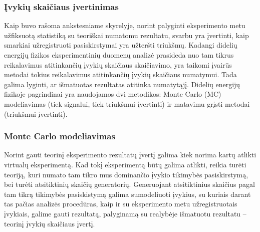 \documentclass[a4paper, 12pt]{article}
\begin{document}


\subsubsection{Įvykių skaičiaus įvertinimas} \label{sec:estimation}

Kaip buvo rašoma ankstesniame skyrelyje, norint palyginti eksperimento metu užfiksuotą
statistiką su teoriškai numatomu rezultatu, svarbu yra įvertinti, kaip smarkiai užregistruoti
pasiskirstymai yra užteršti triukšmų.
Kadangi didelių energijų fizikos eksperimentinių duomenų analizė prasideda nuo tam tikrus
reikalavimus atitinkančių įvykių skaičiaus skaičiavimo, yra taikomi įvairūs metodai
tokius reikalavimus atitinkančių įvykių skaičiaus numatymui.
Tada galima lyginti, ar išmatuotas rezultatas atitinka numatytąjį.
Didelių energijų fizikoje pagrindinai yra naudojamos dvi metodikos: Monte Carlo (MC) modeliavimas
(tiek signalui, tiek triukšmui įvertinti) ir matavimu grįsti metodai (triukšmui įvertinti).

\subsubsection*{Monte Carlo modeliavimas}

Norint gauti teorinį eksperimento rezultatų įvertį galima kiek norima kartų atlikti virtualų
eksperimentą.
Kad tokį eksperimentą būtų galima atlikti, reikia turėti teoriją, kuri numato tam tikro mus
dominančio įvykio tikimybės pasiskirstymą, bei turėti atsitiktinių skaičių generatorių.
Generuojant atsitiktinius skaičius pagal tam tikrą tikimybės pasiskistymą galima sumodeliuoti
įvykius, su kuriais darant tas pačias analizės procedūras, kaip ir su eksperimento metu
užregistruotais įvykiais, galime gauti rezultatą, palyginamą su realybėje išmatuotu
rezultatu -- teorinį įvykių skaičiaus įvertį.
\end{document}
